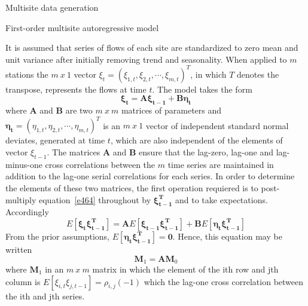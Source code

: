 \documentclass[8pt]{beamer}
\renewcommand{\emph}[1]{\textcolor{myorange}{#1}}
\begin{document}
\begin{frame}{Multisite data generation}
    \begin{block}{First-order multisite autoregressive model}
    \end{block}
    It is assumed that series of flows of each site are \emph{standardized} to \emph{zero mean} and \emph{unit variance} after initially removing \emph{trend} and \emph{seasonality}. When applied to $m$ stations the $m\ x\ 1$ vector $\xi_t = (\xi_{1,t}, \xi_{2,t}, \cdots, \xi_{m,t})^T $, in which $T$ denotes the transpose, represents the flows at time $t$. The model takes the form
    \begin{equation}
        \boldsymbol{\xi_t} = \mathbf{A} \boldsymbol{\xi_{t-1}} + \mathbf{B} \boldsymbol{\eta_t}
        \label{e464}
    \end{equation}
    where $\mathbf{A}$ and $\mathbf{B}$ are two $m\ x\ m$ matrices of parameters and $\boldsymbol{\eta_t} = (\eta_{1,t}, \eta_{2,t}, \cdots, \eta_{m,t})^T$ is an $m\ x\ 1$ vector of \emph{independent standard normal deviates}, generated at time $t$, which are also independent of the elements of vector $\xi_{t-1}$. The matrices $\mathbf{A}$ and $\mathbf{B}$ ensure that the lag-zero, lag-one and lag-minus-one cross correlations between the $m$ time series are maintained in addition to the \emph{lag-one serial correlations} for each series. In order to determine the elements of these two matrices, the first operation requiered is to post-multiply equation~\ref{e464} throughout by $\boldsymbol{\xi_{t-1}^T}$ and to take expectations. Accordingly
    \[
        E[\boldsymbol{\xi_t} \boldsymbol{\xi_{t-1}^T}] = \mathbf{A}E[\boldsymbol{\xi_{t-1}} \boldsymbol{\xi_{t-1}^T}] + \mathbf{B} E[\boldsymbol{\eta_t \xi_{t-1}^T}]
    \]
    From the prior assumptions, $E[\boldsymbol{\eta_t \xi_{t-1}^T}] = \boldsymbol{0}$. Hence, this equation may be written
    \begin{equation}
        \mathbf{M}_1 = \mathbf{A} \mathbf{M}_0
        \label{e465}
    \end{equation}
    where $\mathbf{M}_1$ in an $m\ x\ m$ matrix in which the element of the ith row and jth column is $E[\xi_{i,t} \xi_{j, t-1}] = \rho_{i,j} (-1)$ which the \emph{lag-one cross correlation} between the ith and jth series. 
\end{frame}
\end{document}
